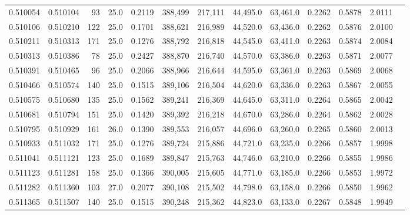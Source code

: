 \begin{tabular}{rrrrrrrrrrrrr}
0.510054 & 0.510104 &    93 & 25.0 &                                     0.2119 & 388,499 & 217,111 &  44,495.0 &  63,461.0 & 0.2262 & 0.5878 & 2.0111 \\
0.510106 & 0.510210 &   122 & 25.0 &                                     0.1701 & 388,621 & 216,989 &  44,520.0 &  63,436.0 & 0.2262 & 0.5876 & 2.0100 \\
0.510211 & 0.510313 &   171 & 25.0 &                                     0.1276 & 388,792 & 216,818 &  44,545.0 &  63,411.0 & 0.2263 & 0.5874 & 2.0084 \\
0.510313 & 0.510386 &    78 & 25.0 &                                     0.2427 & 388,870 & 216,740 &  44,570.0 &  63,386.0 & 0.2263 & 0.5871 & 2.0077 \\
0.510391 & 0.510465 &    96 & 25.0 &                                     0.2066 & 388,966 & 216,644 &  44,595.0 &  63,361.0 & 0.2263 & 0.5869 & 2.0068 \\
0.510466 & 0.510574 &   140 & 25.0 &                                     0.1515 & 389,106 & 216,504 &  44,620.0 &  63,336.0 & 0.2263 & 0.5867 & 2.0055 \\
0.510575 & 0.510680 &   135 & 25.0 &                                     0.1562 & 389,241 & 216,369 &  44,645.0 &  63,311.0 & 0.2264 & 0.5865 & 2.0042 \\
0.510681 & 0.510794 &   151 & 25.0 &                                     0.1420 & 389,392 & 216,218 &  44,670.0 &  63,286.0 & 0.2264 & 0.5862 & 2.0028 \\
0.510795 & 0.510929 &   161 & 26.0 &                                     0.1390 & 389,553 & 216,057 &  44,696.0 &  63,260.0 & 0.2265 & 0.5860 & 2.0013 \\
0.510933 & 0.511032 &   171 & 25.0 &                                     0.1276 & 389,724 & 215,886 &  44,721.0 &  63,235.0 & 0.2266 & 0.5857 & 1.9998 \\
0.511041 & 0.511121 &   123 & 25.0 &                                     0.1689 & 389,847 & 215,763 &  44,746.0 &  63,210.0 & 0.2266 & 0.5855 & 1.9986 \\
0.511123 & 0.511281 &   158 & 25.0 &                                     0.1366 & 390,005 & 215,605 &  44,771.0 &  63,185.0 & 0.2266 & 0.5853 & 1.9972 \\
0.511282 & 0.511360 &   103 & 27.0 &                                     0.2077 & 390,108 & 215,502 &  44,798.0 &  63,158.0 & 0.2266 & 0.5850 & 1.9962 \\
0.511365 & 0.511507 &   140 & 25.0 &                                     0.1515 & 390,248 & 215,362 &  44,823.0 &  63,133.0 & 0.2267 & 0.5848 & 1.9949 \\

\end{tabular}
